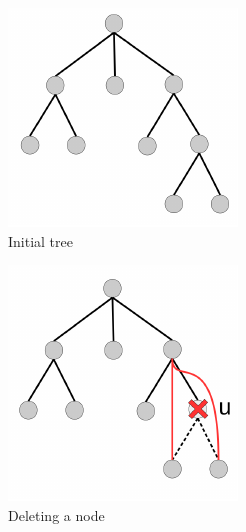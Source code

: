 \begin{figure}[h]
  \centering
  \begin{subfigure}[b]{0.3\textwidth}
    \centering  
    \includegraphics[width=.8\textwidth]{figures/edit.pdf}
    \caption{Initial tree}
  \end{subfigure}
  \begin{subfigure}[b]{0.3\textwidth}
    \centering
    \includegraphics[width=.8\textwidth]{figures/edit_deletion.pdf}
    \caption{Deleting a node}
    \label{fig:deletion}
  \end{subfigure}
  \begin{subfigure}[b]{0.3\textwidth}

\end{subfigure}
\end{figure}
